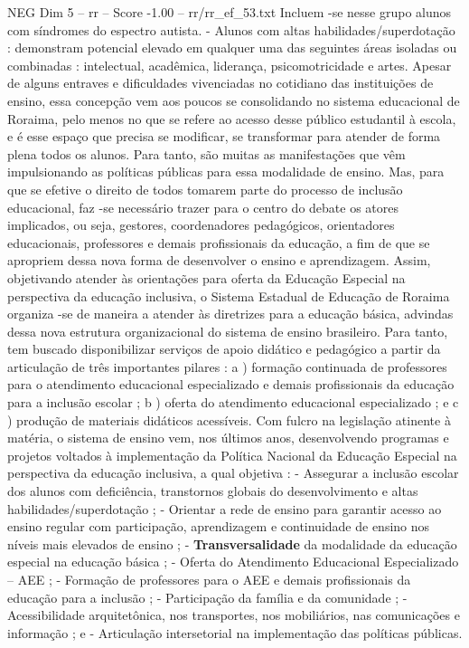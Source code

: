 \begin{textsample}{NEG Dim 5 – rr – Score -1.00 – rr/rr\_ef\_53.txt}
Incluem -se nesse grupo alunos com síndromes do espectro autista. - Alunos com altas habilidades/superdotação : demonstram potencial elevado em qualquer uma das seguintes áreas isoladas ou combinadas : intelectual, acadêmica, liderança, psicomotricidade e artes.
Apesar de alguns entraves e dificuldades vivenciadas no cotidiano das instituições de ensino, essa concepção vem aos poucos se consolidando no sistema educacional de Roraima, pelo menos no que se refere ao acesso desse público estudantil à escola, e é esse espaço que precisa se modificar, se transformar para atender de forma plena todos os alunos.
Para tanto, são muitas as manifestações que vêm impulsionando as políticas públicas para essa modalidade de ensino.
Mas, para que se efetive o direito de todos tomarem parte do processo de inclusão educacional, faz -se necessário trazer para o centro do debate os atores implicados, ou seja, gestores, coordenadores pedagógicos, orientadores educacionais, professores e demais profissionais da educação, a fim de que se apropriem dessa nova forma de desenvolver o ensino e aprendizagem.
Assim, objetivando atender às orientações para oferta da Educação Especial na perspectiva da educação inclusiva, o Sistema Estadual de Educação de Roraima organiza -se de maneira a atender às diretrizes para a educação básica, advindas dessa nova estrutura organizacional do sistema de ensino brasileiro.
Para tanto, tem buscado disponibilizar serviços de apoio didático e pedagógico a partir da articulação de três importantes pilares : a ) formação continuada de professores para o atendimento educacional especializado e demais profissionais da educação para a inclusão escolar ; b ) oferta do atendimento educacional especializado ; e c ) produção de materiais didáticos acessíveis.
Com fulcro na legislação atinente à matéria, o sistema de ensino vem, nos últimos anos, desenvolvendo programas e projetos voltados à implementação da Política Nacional da Educação Especial na perspectiva da educação inclusiva, a qual objetiva : - Assegurar a inclusão escolar dos alunos com deficiência, transtornos globais do desenvolvimento e altas habilidades/superdotação ; - Orientar a rede de ensino para garantir acesso ao ensino regular com participação, aprendizagem e continuidade de ensino nos níveis mais elevados de ensino ; - \textbf{Transversalidade} da modalidade da educação especial na educação básica ; - Oferta do Atendimento Educacional Especializado – AEE ; - Formação de professores para o AEE e demais profissionais da educação para a inclusão ; - Participação da família e da comunidade ; - Acessibilidade arquitetônica, nos transportes, nos mobiliários, nas comunicações e informação ; e - Articulação intersetorial na implementação das políticas públicas.

\end{textsample}

